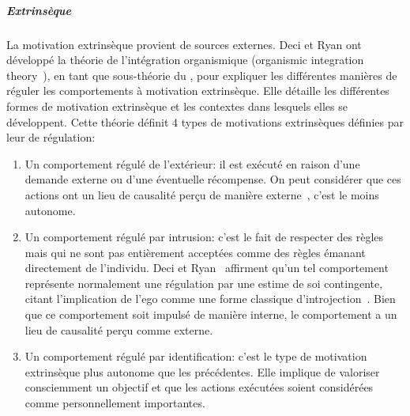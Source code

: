             \subparagraph{Extrinsèque}
                La motivation extrinsèque provient de sources externes. Deci et Ryan ont développé la théorie de l'intégration organismique (organismic integration theory~), en tant que sous-théorie du , pour expliquer les différentes manières de réguler les comportements à motivation extrinsèque. Elle détaille les différentes formes de motivation extrinsèque et les contextes dans lesquels elles se développent.
                Cette théorie définit 4 types de motivations extrinsèques définies par leur  de régulation: 
                \begin{enumerate}\myItemStyle
                    \item Un comportement régulé de l'extérieur: il est exécuté en raison d'une demande externe ou d'une éventuelle récompense. On peut considérer que ces actions ont un lieu de causalité perçu de manière externe~, c'est le moins autonome.
                    \item Un comportement régulé par intrusion: c'est le fait de respecter des règles  mais qui ne sont pas entièrement acceptées comme des règles émanant directement de l'individu. Deci et Ryan~ affirment qu'un tel comportement représente normalement une régulation par une estime de soi contingente, citant l'implication de l'ego comme une forme classique d'introjection~. Bien que ce comportement soit impulsé de manière interne, le comportement a un lieu de causalité perçu comme externe. %
                    \item Un comportement régulé par identification: c'est le type de motivation extrinsèque plus autonome que les précédentes. Elle implique de valoriser consciemment un objectif et que les actions exécutées soient considérées comme personnellement importantes. 

\end{enumerate}
